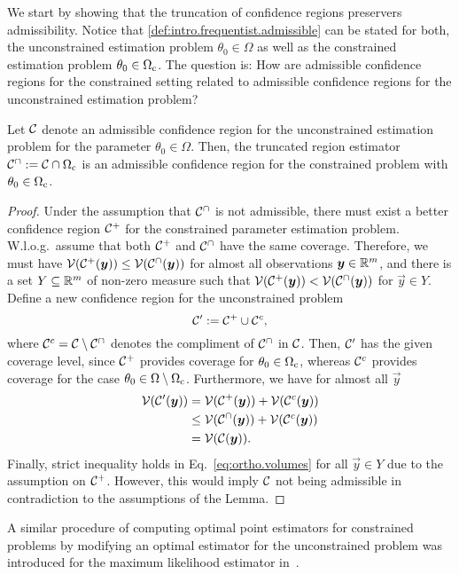 We start by showing that the truncation of confidence regions preservers admissibility.
Notice that \cref{def:intro.frequentist.admissible} can be stated for both, the unconstrained estimation problem $\theta_0 \in \Omega$ as well as the constrained estimation problem $\theta_0 \in \Omega_{\mathrm{c}}$.
The question is: How are admissible confidence regions for the constrained setting related to admissible confidence regions for the unconstrained estimation problem?
\begin{lemma}\label{lem:ortho.admissible_truncation}
  Let $\mathcal{C}$ denote an admissible confidence region for the unconstrained estimation problem for the parameter $\theta_0 \in \Omega$.
  Then, the truncated region estimator $\mathcal{C}^\cap := \mathcal{C}\cap\Omega_{\mathrm{c}}$ is an admissible confidence region for the constrained problem with $\theta_0 \in \Omega_{\mathrm{c}}$.
\end{lemma}
\begin{proof}
  Under the assumption that $\mathcal{C}^\cap$ is not admissible, there must exist a better confidence region $\mathcal{C}^+$ for the constrained parameter estimation problem.
  W.l.o.g.\ assume that both $\mathcal{C}^+$ and $\mathcal{C}^\cap$ have the same coverage.
  Therefore, we must have $\mathcal{V}(\mathcal{C}^+({\boldsymbol{y}})) \leq \mathcal{V}(\mathcal{C}^\cap({\boldsymbol{y}}))$ for almost all observations ${\boldsymbol{y}} \in \mathbb{R}^m$, and there is a set $Y \subseteq \mathbb{R}^m$ of non-zero measure such that $\mathcal{V}(\mathcal{C}^+({\boldsymbol{y}})) < \mathcal{V}(\mathcal{C}^\cap({\boldsymbol{y}}))$ for $\vec y \in Y$.
  Define a new confidence region for the unconstrained problem
  \[
    \mathcal{C}' := \mathcal{C}^+ \cup \mathcal{C}^c,
    \label{eq:ortho.new_region}
  \]
  where $\mathcal{C}^{c}=\mathcal{C}\setminus \mathcal{C}^{\cap}$ denotes the compliment of $\mathcal{C}^{\cap}$ in $\mathcal{C}$.
  Then, $\mathcal{C}'$ has the given coverage level, since $\mathcal{C}^+$ provides coverage for $\theta_0 \in \Omega_{\mathrm{c}}$, whereas $\mathcal{C}^c$ provides coverage for the case $\theta_0 \in \Omega \setminus \Omega_{\mathrm{c}}$.
  Furthermore, we have for almost all $\vec y$
  \[
    \label{eq:ortho.volumes}
    \begin{split}
      \mathcal{V}(\mathcal{C}'({\boldsymbol{y}}))
      &= \mathcal{V}(\mathcal{C}^+({\boldsymbol{y}})) + \mathcal{V}(\mathcal{C}^c({\boldsymbol{y}})) \\
      &\leq \mathcal{V}(\mathcal{C}^\cap({\boldsymbol{y}})) + \mathcal{V}(\mathcal{C}^c({\boldsymbol{y}})) \\
      &= \mathcal{V}(\mathcal{C}({\boldsymbol{y}})).
    \end{split}
  \]
  Finally, strict inequality holds in Eq.~\eqref{eq:ortho.volumes} for all $\vec y \in Y$ due to the assumption on $\mathcal{C}^+$.
  However, this would imply $\mathcal{C}$ not being admissible in contradiction to the assumptions of the Lemma.
\end{proof}
A similar procedure of computing optimal point estimators for constrained problems by modifying an optimal estimator for the unconstrained problem was introduced for the maximum likelihood estimator in~\cite{Smolin_2012_Maximum}.\\




